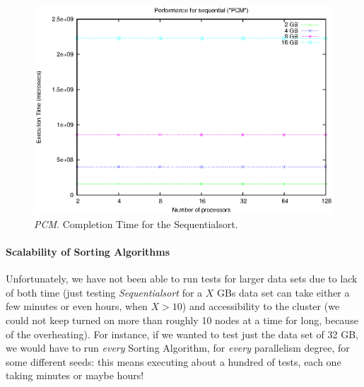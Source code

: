 \begin{figure}[t]
    \begin{center}
        \includegraphics[scale=0.6]{plots/test_01_PCM/NxTxM/sequential_PCM_NxTxM_huge}
    \end{center}
    \caption{\textit{PCM}. Completion Time for the Sequentialsort.}
    \label{sequential-PCM}
\end{figure}

\paragraph{Scalability of Sorting Algorithms}
Unfortunately, we have not been able to run tests for larger data sets due to lack of both time (just testing \textit{Sequentialsort} for a $X$ GBs data set can take either a few minutes or even hours, when $X > 10$) and accessibility to the cluster (we could not keep turned on more than roughly 10 nodes at a time for long, because of the overheating). For instance, if we wanted to test just the data set of 32 GB, we would have to run \textit{every} Sorting Algorithm, for \textit{every} parallelism degree, for some different seeds: this means executing about a hundred of tests, each one taking minutes or maybe hours!  

